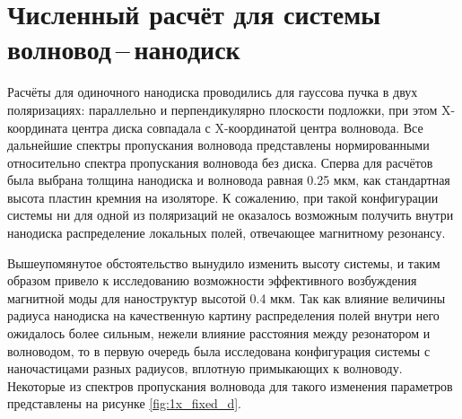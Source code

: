 \section{Численный расчёт для системы волновод\,--\,нанодиск}

Расчёты для одиночного нанодиска проводились для гауссова пучка в двух поляризациях: параллельно и перпендикулярно плоскости подложки, при этом X-координата центра диска совпадала с X-координатой центра волновода. Все дальнейшие спектры пропускания волновода представлены нормированными относительно спектра пропускания волновода без диска. Сперва для расчётов была выбрана толщина нанодиска и волновода равная 0.25 мкм, как стандартная высота пластин кремния на изоляторе. К сожалению, при такой конфигурации системы ни для одной из поляризаций не оказалось возможным получить внутри нанодиска распределение локальных полей, отвечающее магнитному резонансу. 

Вышеупомянутое обстоятельство вынудило изменить высоту системы, и таким образом привело к исследованию возможности эффективного возбуждения магнитной моды для наноструктур высотой 0.4 мкм. Так как влияние величины радиуса нанодиска на качественную картину распределения полей внутри него ожидалось более сильным, нежели влияние расстояния между резонатором и волноводом, то в первую очередь была исследована конфигурация системы с наночастицами разных радиусов, вплотную примыкающих к волноводу. Некоторые из спектров пропускания волновода для такого изменения параметров представлены на рисунке \ref{fig:1x_fixed_d}.

